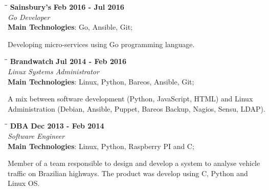 \documentclass[margin]{res}
\begin{document}
\begin{resume}
\vspace{-0.1in}
   \begin{tabbing}
   \hspace{2.3in}\= \hspace{1.7in}\= \kill %
    \textbf{Sainsbury's}    \>\>\textbf{Feb 2016 - Jul 2016}\\
    \textit{Go Developer}\\        
    \textbf{Main Technologies}: Go, Ansible, Git;
   \end{tabbing}\vspace{-20pt}      %
    \vspace{2mm}
Developing micro-services using Go programming language.

\vspace{-0.1in}
   \begin{tabbing}
   \hspace{2.3in}\= \hspace{1.7in}\= \kill %
    \textbf{Brandwatch}    \>\>\textbf{Jul 2014 - Feb 2016}\\
    \textit{Linux Systems Administrator}\\        
    \textbf{Main Technologies}: Linux, Python, Bareos, Ansible, Git;
   \end{tabbing}\vspace{-20pt}      %
    \vspace{2mm}
A mix between software development (Python, JavaScript, HTML) and Linux Administration (Debian, Ansible, Puppet, Bareos Backup, Nagios, Sensu, LDAP).

\vspace{-0.1in}
   \begin{tabbing}
   \hspace{2.3in}\= \hspace{1.7in}\= \kill %
    \textbf{DBA}    \>\>\textbf{Dec 2013 - Feb 2014}\\
    \textit{Software Engineer}\\        
    \textbf{Main Technologies}: Linux, Python, Raspberry PI and C;
   \end{tabbing}\vspace{-20pt}      %
    \vspace{2mm}
        Member of a team responsible to design and develop a system to analyse vehicle traffic on Brazilian highways. The product was develop using C, Python and Linux OS.


\end{resume}
\end{document}
